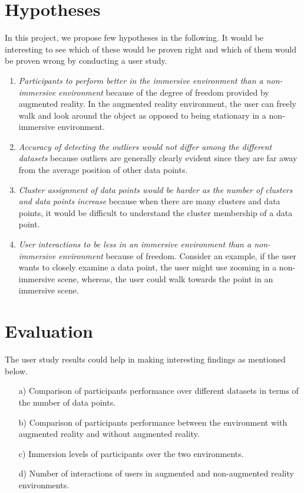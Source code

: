\documentclass[journal]{vgtc}                %
\begin{document}
\section{Hypotheses}
In this project, we propose few hypotheses in the following. It would be interesting to see which of these would be proven right and which of them would be proven wrong by conducting a user study.
\begin{enumerate}
    \item \textit{Participants to perform better in the immersive environment than a non-immersive environment} because of the degree of freedom provided by augmented reality. In the augmented reality environment, the user can freely walk and look around the object as opposed to being stationary in a non-immersive environment.
    \item \textit{Accuracy of detecting the outliers would not differ among the different datasets} because outliers are generally clearly evident since they are far away from the average position of other data points.
    \item \textit{Cluster assignment of data points would be harder as the number of clusters and data points increase} because when there are many clusters and data points, it would be difficult to understand the cluster membership of a data point.
    \item \textit{User interactions to be less in an immersive environment than a non-immersive environment} because of freedom. Consider an example, if the user wants to closely examine a data point, the user might use zooming in a non-immersive scene, whereas, the user could walk towards the point in an immersive scene.
\end{enumerate}

\section{Evaluation}

The user study results could help in making interesting findings as mentioned below.

\begin{enumerate}
    \item[a)] Comparison of participants performance over different datasets in terms of the number of data points.
    \item[b)] Comparison of participants performance between the environment with augmented reality and without augmented reality.
    \item[c)] Immersion levels of participants over the two environments.
    \item[d)] Number of interactions of users in augmented and non-augmented reality environments.
\end{enumerate}
 
\end{document}
